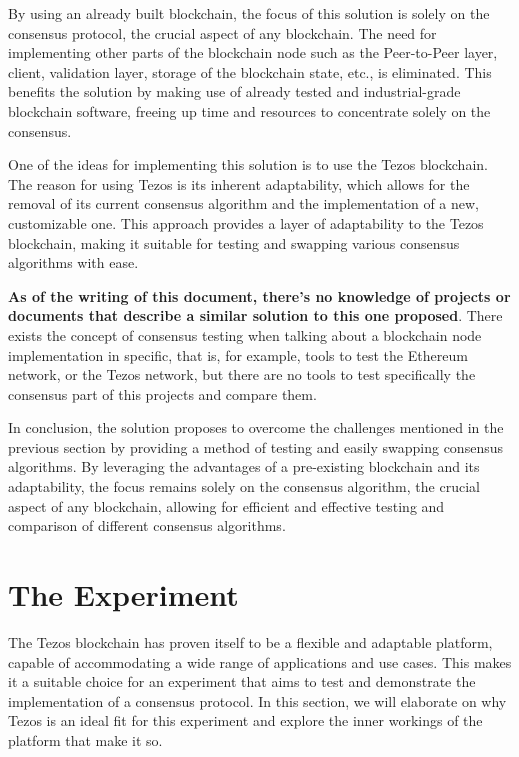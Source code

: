 By using an already built blockchain, the focus of this solution is solely on the consensus protocol, the crucial aspect of any blockchain. The need for implementing other parts of the blockchain node such as the Peer-to-Peer layer, client, validation layer, storage of the blockchain state, etc., is eliminated. This benefits the solution by making use of already tested and industrial-grade blockchain software, freeing up time and resources to concentrate solely on the consensus.

One of the ideas for implementing this solution is to use the Tezos blockchain. The reason for using Tezos is its inherent adaptability, which allows for the removal of its current consensus algorithm and the implementation of a new, customizable one. This approach provides a layer of adaptability to the Tezos blockchain, making it suitable for testing and swapping various consensus algorithms with ease.

\textbf{As of the writing of this document, there's no knowledge of projects or documents that describe a similar solution to this one proposed}. There exists the concept of consensus testing when talking about a blockchain node implementation in specific, that is, for example, tools to test the Ethereum network, or the Tezos network, but there are no tools to test specifically the consensus part of this projects and compare them.

In conclusion, the solution proposes to overcome the challenges mentioned in the previous section by providing a method of testing and easily swapping consensus algorithms. By leveraging the advantages of a pre-existing blockchain and its adaptability, the focus remains solely on the consensus algorithm, the crucial aspect of any blockchain, allowing for efficient and effective testing and comparison of different consensus algorithms.


\section{The Experiment}

The Tezos blockchain has proven itself to be a flexible and adaptable platform, capable of accommodating a wide range of applications and use cases. This makes it a suitable choice for an experiment that aims to test and demonstrate the implementation of a consensus protocol. In this section, we will elaborate on why Tezos is an ideal fit for this experiment and explore the inner workings of the platform that make it so.

